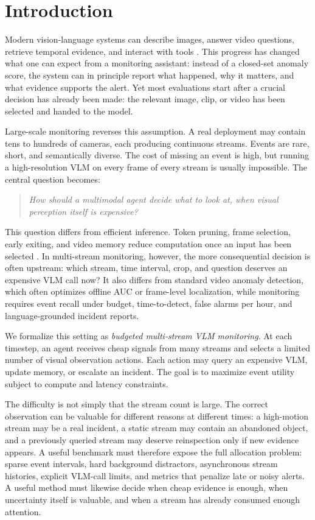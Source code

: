 \section{Introduction}

Modern vision-language systems can describe images, answer video questions, retrieve temporal evidence, and interact with tools \citep{radford2021clip,alayrac2022flamingo,li2023blip2,liu2023llava}. This progress has changed what one can expect from a monitoring assistant: instead of a closed-set anomaly score, the system can in principle report what happened, why it matters, and what evidence supports the alert. Yet most evaluations start after a crucial decision has already been made: the relevant image, clip, or video has been selected and handed to the model.

Large-scale monitoring reverses this assumption. A real deployment may contain tens to hundreds of cameras, each producing continuous streams. Events are rare, short, and semantically diverse. The cost of missing an event is high, but running a high-resolution VLM on every frame of every stream is usually impossible. The central question becomes:

\begin{quote}
\emph{How should a multimodal agent decide what to look at, when visual perception itself is expensive?}
\end{quote}

This question differs from efficient inference. Token pruning, frame selection, early exiting, and video memory reduce computation once an input has been selected \citep{wu2019adaframe,rao2021dynamicvit,bolya2023tome}. In multi-stream monitoring, however, the more consequential decision is often upstream: which stream, time interval, crop, and question deserves an expensive VLM call now? It also differs from standard video anomaly detection, which often optimizes offline AUC or frame-level localization, while monitoring requires event recall under budget, time-to-detect, false alarms per hour, and language-grounded incident reports.

We formalize this setting as \emph{budgeted multi-stream VLM monitoring}. At each timestep, an agent receives cheap signals from many streams and selects a limited number of visual observation actions. Each action may query an expensive VLM, update memory, or escalate an incident. The goal is to maximize event utility subject to compute and latency constraints.

The difficulty is not simply that the stream count is large. The correct observation can be valuable for different reasons at different times: a high-motion stream may be a real incident, a static stream may contain an abandoned object, and a previously queried stream may deserve reinspection only if new evidence appears. A useful benchmark must therefore expose the full allocation problem: sparse event intervals, hard background distractors, asynchronous stream histories, explicit VLM-call limits, and metrics that penalize late or noisy alerts. A useful method must likewise decide when cheap evidence is enough, when uncertainty itself is valuable, and when a stream has already consumed enough attention.

